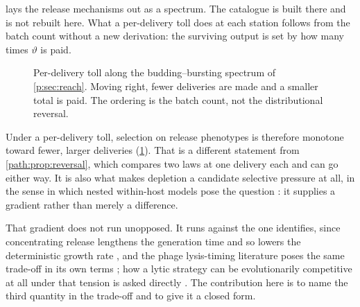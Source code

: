  lays the release mechanisms out as a spectrum. The catalogue is built there and is not rebuilt
here. What a per-delivery toll does at each station follows from the batch
count without a new derivation: the surviving output is set by how many
times $\vartheta$ is paid.

\begin{figure}[!h]
\centering
{}
\caption{Per-delivery toll along the budding--bursting spectrum of
\cref{p:sec:reach}. Moving right, fewer deliveries are made and a
smaller total is paid. The ordering is the batch count, not the
distributional reversal.}
\label{path:fig:tollspectrum}
\end{figure}

Under a per-delivery toll, selection on release phenotypes is therefore
monotone toward fewer, larger deliveries
(\cref{path:fig:tollspectrum}). That is a different
statement from \cref{path:prop:reversal}, which compares two laws at one
delivery each and can go either way. It is also what makes depletion a
candidate selective pressure at all, in the sense in which nested
within-host models pose the question \cite{gilchrist2006evolution}: it
supplies a gradient rather than merely a difference.

That gradient does not run unopposed. It runs against the one \ChPop{}
identifies, since concentrating release lengthens the generation time and so
lowers the deterministic growth rate \cite{wallinga2007generation}, and the
phage lysis-timing literature poses the same trade-off in its own terms
\cite{wang2006lysis}; how a lytic strategy can be evolutionarily competitive
at all under that tension is asked directly \cite{komarova2007viral}. The
contribution here is to name the third quantity in the trade-off and to give
it a closed form.

